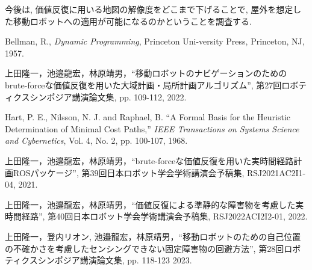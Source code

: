 \documentclass{jarticle}
\begin{document}
今後は, 価値反復に用いる地図の解像度をどこまで下げることで, 
屋外を想定した移動ロボットへの適用が可能になるのかということを調査する. 

\footnotesize
\begin{thebibliography}{99}

	Bellman, R., {\it Dynamic Programming}, Princeton Uni-versity Press, Princeton, NJ, 1957.

	上田隆一，池邉龍宏，林原靖男，``移動ロボットのナビゲーションのためのbrute-forceな価値反復を用いた大域計画・局所計画アルゴリズム'', 
	第27回ロボティクスシンポジア講演論文集, pp. 109-112, 2022.
	
	Hart, P. E., Nilsson, N. J. and Raphael, B. ``A Formal
	Basis for the Heuristic Determination of Minimal Cost
	Paths,'' {\it IEEE Transactions on Systems Science and Cybernetics}, Vol. 4, No. 2, pp. 100-107, 1968.
	
	上田隆一，池邉龍宏，林原靖男，``brute-forceな価値反復を用いた実時間経路計画ROSパッケージ'', 
	第39回日本ロボット学会学術講演会予稿集, RSJ2021AC2I1-04, 2021.

	上田隆一，池邉龍宏，林原靖男，``価値反復による準静的な障害物を考慮した実時間経路'', 
	第40回日本ロボット学会学術講演会予稿集, RSJ2022ACI2I2-01, 2022.

	上田隆一，登内リオン, 池邉龍宏，林原靖男，``移動ロボットのための自己位置の不確かさを考慮したセンシングできない固定障害物の回避方法'', 
	第28回ロボティクスシンポジア講演論文集, pp. 118-123 2023.

\end{thebibliography}

\normalsize
\end{document}
